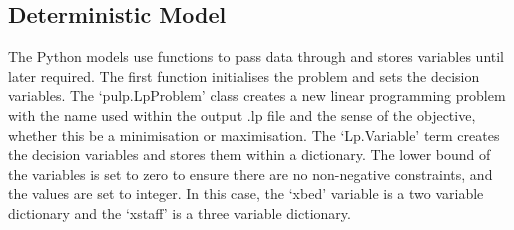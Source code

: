 \documentclass[../thesis.tex]{subfiles}
\begin{document}
\subsection{Deterministic Model}
The Python models use functions to pass data through and stores variables until later required. The first function initialises the problem and sets the decision variables. The `pulp.LpProblem' class creates a new linear programming problem with the name used within the output .lp file and the sense of the objective, whether this be a minimisation or maximisation. The `Lp.Variable' term creates the decision variables and stores them within a dictionary. The lower bound of the variables is set to zero to ensure there are no non-negative constraints, and the values are set to integer. In this case, the `xbed' variable is a two variable dictionary and the `xstaff' is a three variable dictionary.
\end{document}
